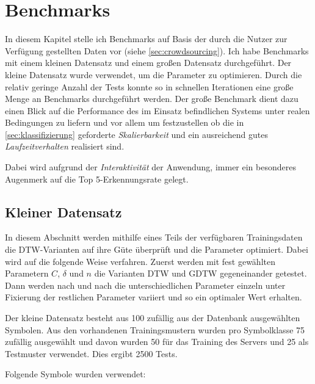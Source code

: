 \chapter{Benchmarks} %
\label{cha:benchmarks}

In diesem Kapitel stelle ich Benchmarks auf Basis der durch die Nutzer zur Verfügung gestellten Daten vor (siehe \ref{sec:crowdsourcing}). Ich habe Benchmarks mit einem kleinen Datensatz und einem großen Datensatz durchgeführt. Der kleine Datensatz wurde verwendet, um die Parameter zu optimieren. Durch die relativ geringe Anzahl der Tests konnte so in schnellen Iterationen eine große Menge an Benchmarks durchgeführt werden. Der große Benchmark dient dazu einen Blick auf die Performance des im Einsatz befindlichen Systems unter realen Bedingungen zu liefern und vor allem um festzustellen ob die in \ref{sec:klassifizierung} geforderte \emph{Skalierbarkeit} und ein ausreichend gutes \emph{Laufzeitverhalten} realisiert sind.

Dabei wird aufgrund der \emph{Interaktivität} der Anwendung, immer ein besonderes Augenmerk auf die Top 5-Erkennungsrate gelegt.

\section{Kleiner Datensatz}
\label{sec:kleiner_datensatz}

In diesem Abschnitt werden mithilfe eines Teils der verfügbaren Trainingsdaten die DTW-Varianten auf ihre Güte überprüft und die Parameter optimiert. Dabei wird auf die folgende Weise verfahren. Zuerst werden mit fest gewählten Parametern $C$, $\delta$ und $n$ die Varianten \ac{DTW} und \ac{GDTW} gegeneinander getestet. Dann werden nach und nach die unterschiedlichen Parameter einzeln unter Fixierung der restlichen Parameter variiert und so ein optimaler Wert erhalten.

Der kleine Datensatz besteht aus 100 zufällig aus der Datenbank ausgewählten Symbolen. Aus den vorhandenen Trainingsmustern wurden pro Symbolklasse 75 zufällig ausgewählt und davon wurden 50 für das Training des Servers und 25 als Testmuster verwendet. Dies ergibt 2500 Tests.

Folgende Symbole wurden verwendet:

